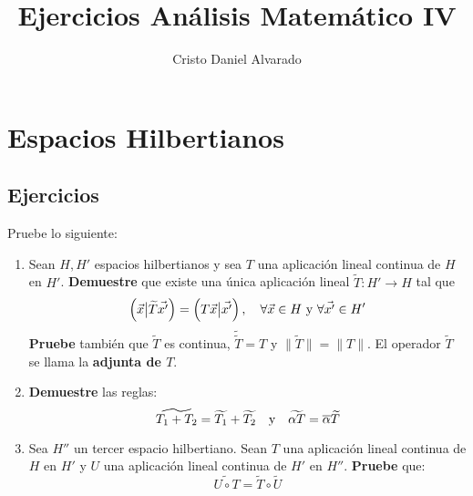 \documentclass[12pt]{report}
\theoremstyle{largebreak}
\newcommand\cf[3]{\ensuremath{#1:#2\rightarrow#3}}
\newcommand\adj[1]{\ensuremath{\widetilde{#1}}}
\newcommand\pint[2]{\ensuremath{\left(#1\big|#2\right)}}
\newcommand\conj[1]{\ensuremath{\overline{#1}}}
\newcommand\norm[1]{\ensuremath{\|#1\|}}
\begin{document}
    \title{Ejercicios Análisis Matemático IV}
    \author{Cristo Daniel Alvarado}
    \maketitle

    \tableofcontents %

    \chapter{Espacios Hilbertianos}

    \section{Ejercicios}

    \renewcommand{\theenumi}{\roman{enumi}}

    \begin{excer}
        Pruebe lo siguiente:
        \begin{enumerate}
            \item Sean $H,H'$ espacios hilbertianos y sea $T$ una aplicación lineal continua de $H$ en $H'$. \textbf{Demuestre} que existe una única aplicación lineal $\cf{\adj{T}}{H'}{H}$ tal que
            \begin{equation*}
                \pint{\vec{x}}{\adj{T}\vec{x'}}=\pint{T\vec{x}}{\vec{x'}},\quad\forall\vec{x}\in H\textup{ y }\forall\vec{x'}\in H'
            \end{equation*}
            \textbf{Pruebe} también que $\adj{T}$ es continua, $\adj{\adj{T}}=T$ y $\norm{\adj{T}}=\norm{T}$. El operador $\adj{T}$ se llama la \textbf{adjunta de $T$}.
            \item \textbf{Demuestre} las reglas:
            \begin{equation*}
                \adj{T_1+T_2}=\adj{T_1}+\adj{T_2}\quad\textup{y}\quad\adj{\alpha T}=\conj{\alpha}\adj{T}
            \end{equation*}
            \item Sea $H''$ un tercer espacio hilbertiano. Sean $T$ una aplicación lineal continua de $H$ en $H'$ y $U$ una aplicación lineal continua de $H'$ en $H''$. \textbf{Pruebe} que:
            \begin{equation*}
                \adj{U\circ T}=\adj{T}\circ\adj{U}
            \end{equation*}
        \end{enumerate}
    \end{excer}
\end{document}
